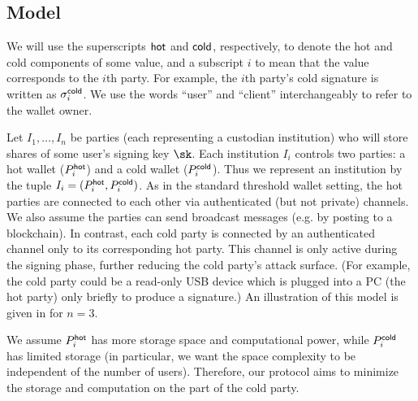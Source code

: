 \subsection{Model}\label{sec:hc_model}



We will use the superscripts $\mathsf{hot}$ and $\mathsf{cold}$, respectively, to denote the hot and cold components of some value, and a subscript $i$ to mean that the value corresponds to the $i$th party. For example, the $i$th party's cold signature is written as $\sigma_i^{\mathsf{cold}}$. We use the words ``user'' and ``client'' interchangeably to refer to the wallet owner. 

Let $I_1, \ldots, I_n$ be parties (each representing a custodian institution) who will store shares of some user's signing key $\sk$. Each institution $I_i$ controls two parties: a hot wallet ($P_i^{\mathsf{hot}}$) and a cold wallet ($P_i^{\mathsf{cold}}$). Thus we represent an institution by the tuple $I_i = (P_i^{\mathsf{hot}}, P_i^{\mathsf{cold}})$. 
As in the standard threshold wallet setting, the hot parties are connected to each other via authenticated (but not private) channels. We also assume the parties can send broadcast messages (e.g. by posting to a blockchain).  %
In contrast, each cold party is connected by an authenticated channel only to its corresponding hot party. This channel is only active during the signing phase, further reducing the cold party's attack surface. (For example, the cold party could be a read-only USB device which is plugged into a PC (the hot party) only briefly to produce a signature.) 
An illustration of this model is given in  for $n=3$.

We assume $P_i^{\mathsf{hot}}$ has more storage space and computational power, while $P_i^{\mathsf{cold}}$ has limited storage (in particular, we want the space complexity to be independent of the number of users). 
Therefore, our protocol aims to minimize the storage and computation on the part of the cold party.
